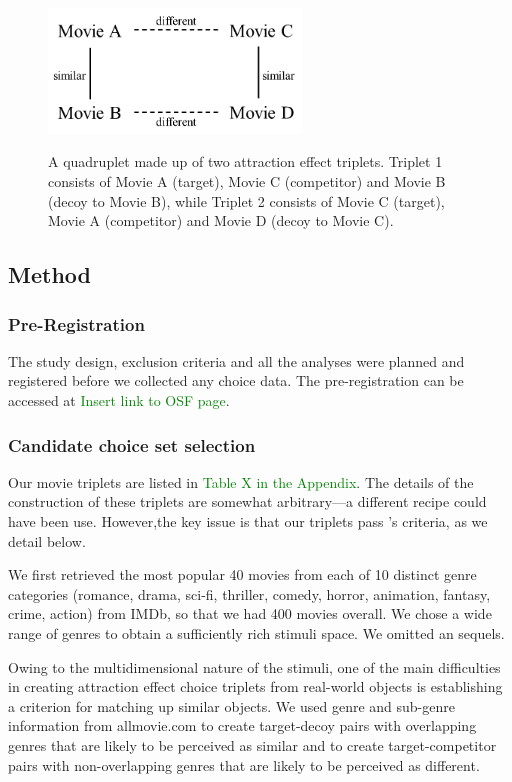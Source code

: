 \documentclass[12pt, a4paper]{article}
\newcommand{\NS}[1] {{\textcolor{green}{#1}}}
\begin{document}
 \begin{figure}
\centering
\captionsetup{justification=centering}
\caption{A quadruplet made up of two attraction effect triplets. Triplet 1 consists of Movie A (target), Movie C (competitor) and Movie B (decoy to Movie B), while Triplet 2 consists of Movie C (target), Movie A (competitor) and Movie D (decoy to Movie C).}
\includegraphics[width=0.6\textwidth]{quadruplets.png}
\label{fig:quadruplets}
\end{figure}

\subsection{Method}

\subsubsection{Pre-Registration}
The study design, exclusion criteria and all the analyses were planned and registered before we collected any choice data. The pre-registration can be accessed at \NS{Insert link to OSF page}.

\subsubsection{Candidate choice set selection}

Our movie triplets are listed in \NS{Table X in the Appendix}. The details of the construction of these triplets are somewhat arbitrary---a different recipe could have been use. However,the key issue is that our triplets pass \citeauthor{Huber2014}'s \citeyear{Huber2014} criteria, as we detail below.

We first retrieved the most popular 40 movies from each of 10 distinct genre categories (romance, drama, sci-fi, thriller, comedy, horror, animation, fantasy, crime, action) from IMDb, so that we had 400 movies overall. We chose a wide range of genres to obtain a sufficiently rich stimuli space. We omitted an sequels.

Owing to the multidimensional nature of the stimuli, one of the main difficulties in creating attraction effect choice triplets from real-world objects is establishing a criterion for matching up similar objects. We used genre and sub-genre information from allmovie.com to create target-decoy pairs with overlapping genres that are likely to be perceived as similar and to create target-competitor pairs with non-overlapping genres that are likely to be perceived as different.
\end{document}
